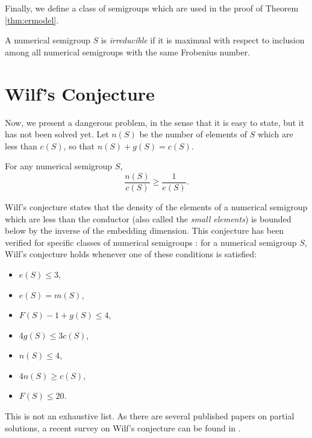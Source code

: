 Finally, we define a class of semigroups which are used in the proof of Theorem \ref{thm:ermodel}. 

\begin{definition}\label{def:smgps:irreducible}
    A numerical semigroup $S$ is \textit{irreducible} if it is maximual with respect to inclusion among all numerical semigroups with the same Frobenius number.
\end{definition}


\section{Wilf's Conjecture}\label{sec:smgps:theme2}

Now, we present a dangerous problem, in the sense that it is easy to state, but it has not been solved yet. Let $n(S)$ be the number of elements of $S$ which are less than $c(S)$, so that $n(S) + g(S) = c(S)$.\par 

\begin{conjecture}[Wilf, 1978] \cite{wilf1978circle}\label{conj:smgps:wilf}
    For any numerical semigroup $S$,
    \[\frac{n(S)}{c(S)} \geq \frac{1}{e(S)}.\]
\end{conjecture}

Wilf's conjecture states that the density of the elements of a numerical semigroup which are less than the conductor (also called the \textit{small elements}) is bounded below by the inverse of the embedding dimension. This conjecture has been verified for specific classes of numerical semigroups \cite{assi2020numerical}: for a numerical semigroup $S$, Wilf's conjecture holds whenever one of these conditions is satisfied:
\begin{itemize}
    \item $e(S) \leq 3$,
    \item $e(S) = m(S)$,
    \item $F(S) - 1 + g(S) \leq 4$,
    \item $4g(S) \leq 3c(S)$,
    \item $n(S) \leq 4$,
    \item $4n(S) \geq c(S)$,
    \item $F(S) \leq 20$.
\end{itemize}

This is not an exhaustive list. As there are several published papers on partial solutions, a recent survey on Wilf's conjecture can be found in \cite{2020conjecture}. \par